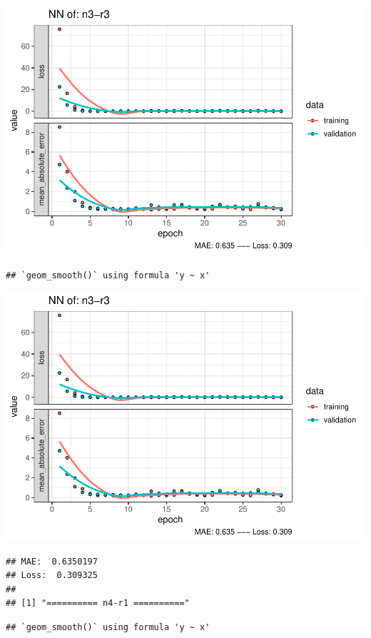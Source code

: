 \documentclass[
]{article}
\begin{document}
\includegraphics{project-code_files/figure-latex/unnamed-chunk-18-27.pdf}

\begin{verbatim}
## `geom_smooth()` using formula 'y ~ x'
\end{verbatim}

\includegraphics{project-code_files/figure-latex/unnamed-chunk-18-28.pdf}

\begin{verbatim}
## MAE:  0.6350197
## Loss:  0.309325 
## 
## [1] "========== n4-r1 =========="
\end{verbatim}

\begin{verbatim}
## `geom_smooth()` using formula 'y ~ x'
\end{verbatim}
\end{document}
